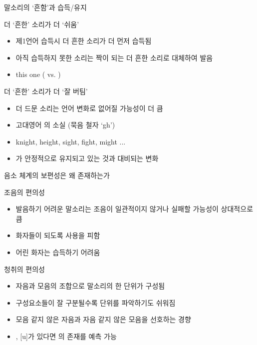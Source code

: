 \documentclass[11pt, aspectratio=169]{beamer}
\newcommand{\textds}[1]{{\ipafont #1}}
\begin{document}
\begin{frame}[t]{말소리의 ‘흔함’과 습득/유지}
    \begin{block}{더 ‘흔한’ 소리가 더 ‘쉬움’}
        \begin{itemize}
            \item 제1언어 습득시 더 흔한 소리가 더 먼저 습득됨
            \item 아직 습득하지 못한 소리는 짝이 되는 더 흔한 소리로 대체하여 발음
            \item [] this one \textds{[dɪs wʌn]} (\textds{[d]} vs. \textds{[ð]})
        \end{itemize}
    \end{block}
    \begin{block}{더 ‘흔한’ 소리가 더 ‘잘 버팀’}
        \begin{itemize}
            \item 더 드문 소리는 언어 변화로 없어질 가능성이 더 큼
            \item [] 고대영어 \textds{[x]}의 소실 (묵음 철자 ‘gh’)
            \item [] \rightarrow knight, height, sight, fight, might ... 
            \item [] \textds{[k]}가 안정적으로 유지되고 있는 것과 대비되는 변화
        \end{itemize}
    \end{block}
\end{frame}

\begin{frame}[t]{음소 체계의 보편성은 왜 존재하는가}
    \begin{block}{조음의 편의성}
        \begin{itemize}
            \item 발음하기 어려운 말소리는 조음이 일관적이지 않거나 실패할 가능성이 상대적으로 큼
            \item 화자들이 되도록 사용을 피함
            \item 어린 화자는 습득하기 어려움
        \end{itemize}
    \end{block}
    \begin{block}{청취의 편의성}
        \begin{itemize}
            \item 자음과 모음의 조합으로 말소리의 한 단위가 구성됨
            \item 구성요소들이 잘 구분될수록 단위를 파악하기도 쉬워짐
            \item [] \rightarrow 모음 같지 않은 자음과 자음 같지 않은 모음을 선호하는 경향
            \item [] \textds{[i], [u]}가 있다면 \textds{[a]}의 존재를 예측 가능
        \end{itemize}
    \end{block}
\end{frame}
\end{document}
